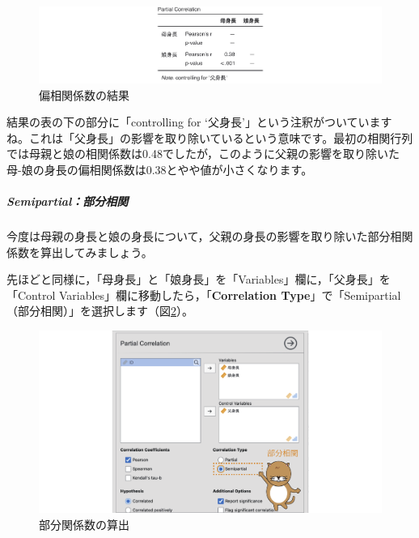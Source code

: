 \documentclass[
  12pt,
  a5jpaper,
  lualatex, ja=standard]{bxjsbook}
\begin{document}
\begin{figure}[!ht]

{\centering \includegraphics[width=1\linewidth]{images/regression/partial-results} 

}

\caption{偏相関係数の結果}\label{fig:regression-partial-results}
\end{figure}

結果の表の下の部分に「controlling for `父身長'」という注釈がついていますね。これは「父身長」の影響を取り除いているという意味です。最初の相関行列では母親と娘の相関係数は0.48でしたが，このように父親の影響を取り除いた母-娘の身長の偏相関係数は0.38とやや値が小さくなります。

\hypertarget{semipartialux90e8ux5206ux76f8ux95a2}{%
\subparagraph*{Semipartial：部分相関}\label{semipartialux90e8ux5206ux76f8ux95a2}}

今度は母親の身長と娘の身長について，父親の身長の影響を取り除いた部分相関係数を算出してみましょう。

先ほどと同様に，「母身長」と「娘身長」を「Variables」欄に，「父身長」を「Control Variables」欄に移動したら，「\textbf{Correlation Type}」で「Semipartial（部分相関）」を選択します（図\ref{fig:regression-semipartial-setting}）。

\begin{figure}[!ht]

{\centering \includegraphics[width=1\linewidth]{images/regression/semipartial-setting} 

}

\caption{部分関係数の算出}\label{fig:regression-semipartial-setting}
\end{figure}
\end{document}
